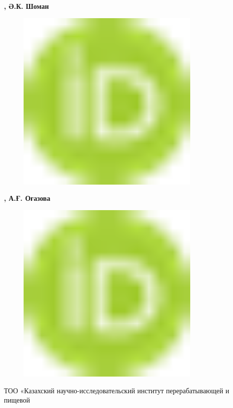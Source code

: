 {\bfseries , Ә.К.
Шоман}
\begin{figure}[H]
	\centering
	\includegraphics[width=0.8\textwidth]{media/pish/image10}
	\caption*{}
\end{figure}
{\bfseries ,
А.Ғ.
Оғазова}
\begin{figure}[H]
	\centering
	\includegraphics[width=0.8\textwidth]{media/pish/image10}
	\caption*{}
\end{figure}
{\bfseries \textsuperscript{\envelope }}

ТОО «Казахский научно-исследовательский институт перерабатывающей и
пищевой

